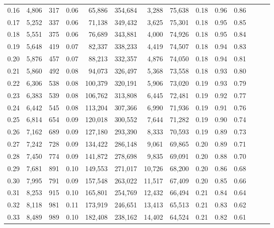 \begin{tabular}{rrrrrrrrrrrrrr}
0.16 &   4,806 &    317 &  0.06 &   65,886 &  354,684 &   3,288 &  75,638 &  0.18 &  0.96 &      0.86 \\
0.17 &   5,252 &    337 &  0.06 &   71,138 &  349,432 &   3,625 &  75,301 &  0.18 &  0.95 &      0.85 \\
0.18 &   5,551 &    375 &  0.06 &   76,689 &  343,881 &   4,000 &  74,926 &  0.18 &  0.95 &      0.84 \\
0.19 &   5,648 &    419 &  0.07 &   82,337 &  338,233 &   4,419 &  74,507 &  0.18 &  0.94 &      0.83 \\
0.20 &   5,876 &    457 &  0.07 &   88,213 &  332,357 &   4,876 &  74,050 &  0.18 &  0.94 &      0.81 \\
0.21 &   5,860 &    492 &  0.08 &   94,073 &  326,497 &   5,368 &  73,558 &  0.18 &  0.93 &      0.80 \\
0.22 &   6,306 &    538 &  0.08 &  100,379 &  320,191 &   5,906 &  73,020 &  0.19 &  0.93 &      0.79 \\
0.23 &   6,383 &    539 &  0.08 &  106,762 &  313,808 &   6,445 &  72,481 &  0.19 &  0.92 &      0.77 \\
0.24 &   6,442 &    545 &  0.08 &  113,204 &  307,366 &   6,990 &  71,936 &  0.19 &  0.91 &      0.76 \\
0.25 &   6,814 &    654 &  0.09 &  120,018 &  300,552 &   7,644 &  71,282 &  0.19 &  0.90 &      0.74 \\
0.26 &   7,162 &    689 &  0.09 &  127,180 &  293,390 &   8,333 &  70,593 &  0.19 &  0.89 &      0.73 \\
0.27 &   7,242 &    728 &  0.09 &  134,422 &  286,148 &   9,061 &  69,865 &  0.20 &  0.89 &      0.71 \\
0.28 &   7,450 &    774 &  0.09 &  141,872 &  278,698 &   9,835 &  69,091 &  0.20 &  0.88 &      0.70 \\
0.29 &   7,681 &    891 &  0.10 &  149,553 &  271,017 &  10,726 &  68,200 &  0.20 &  0.86 &      0.68 \\
0.30 &   7,995 &    791 &  0.09 &  157,548 &  263,022 &  11,517 &  67,409 &  0.20 &  0.85 &      0.66 \\
0.31 &   8,253 &    915 &  0.10 &  165,801 &  254,769 &  12,432 &  66,494 &  0.21 &  0.84 &      0.64 \\
0.32 &   8,118 &    981 &  0.11 &  173,919 &  246,651 &  13,413 &  65,513 &  0.21 &  0.83 &      0.62 \\
0.33 &   8,489 &    989 &  0.10 &  182,408 &  238,162 &  14,402 &  64,524 &  0.21 &  0.82 &      0.61 \\

\end{tabular}
